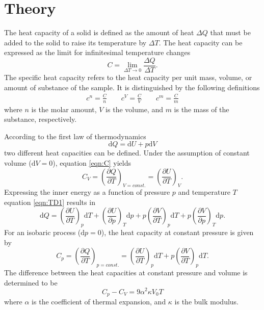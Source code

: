 \section{Theory}
\label{sec:theory}

The heat capacity of a solid is defined as the amount of 
heat $\Delta Q$ that must be added to the solid to raise 
its temperature by $\Delta T$. 
The heat capacity can be expressed as the limit for infinitesimal 
temperature changes
\begin{equation}
    C=\lim_{\Delta T\to 0}\frac{\Delta Q}{\Delta T}.
    \label{eqn:C}
\end{equation}
The specific heat capacity refers to the heat capacity per unit 
mass, volume, or amount of substance of the sample. It is 
distinguished by the following definitions
\begin{align*}
    c^n=\frac{C}{n} \qquad
    c^V=\frac{C}{V} \qquad
    c^m=\frac{C}{m}
\end{align*}
where $n$ is the molar amount, $V$ is the volume, and $m$ is 
the mass of the substance, respectively. 

According to the first law of thermodynamics
\begin{equation*}
    \text{d}Q=\text{d}U+p\text{d}V
    \label{eqn:TD1}
\end{equation*}
two different heat capacities can be defined. 
Under the assumption of constant volume ($\text{d}V=0$), 
equation \eqref{eqn:C} yields 
\begin{equation}
    C_V=\left(\frac{\partial Q}{\partial T}\right)_{V=const.}=\left(\frac{\partial U}{\partial T}\right)_V.
    \label{eqn:CV}
\end{equation}
Expressing the inner energy as a function of pressure $p$ and temperature $T$
equation \eqref{eqn:TD1} results in
\begin{equation*}
    \text{d}Q 
    =\left(\frac{\partial U}{\partial T}\right)_p \text{d} T 
    +\left(\frac{\partial U}{\partial p}\right)_T \text{d} p
    +p\left(\frac{\partial V}{\partial T}\right)_p \text{d} T
    +p\left(\frac{\partial V}{\partial p}\right)_T \text{d} p.
\end{equation*}
For an isobaric process ($\text{d}p=0$), the heat capacity at 
constant pressure is given by
\begin{equation}
    C_p=\left(\frac{\partial Q}{\partial T}\right)_{p=const.}
    =\left(\frac{\partial U}{\partial T}\right)_p \text{d} T 
    +p\left(\frac{\partial V}{\partial T}\right)_p \text{d} T.
    \label{eqn:Cp}
\end{equation}
The difference between the heat capacities at constant pressure and volume is
determined to be
\begin{equation}
    C_p-C_V=9\alpha^2\kappa V_0T
\end{equation}
where $\alpha$ is the coefficient of thermal expansion, and $\kappa$ is the bulk modulus. 

